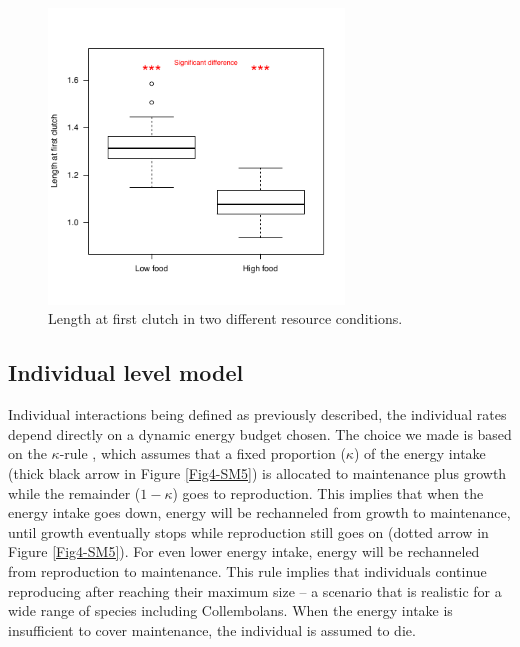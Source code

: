 \begin{figure}[!h] %
\centering
\includegraphics[width=0.7\textwidth]{4_ChapThe1/Fig/FigSM4.pdf}
\caption[Experimental measure of
length at maturity]{Length at first clutch in two different resource
conditions.}
\label{Fig4-SM4}
\end{figure}

\subsection{Individual level model}\label{subsec:SupMat2}

Individual interactions being defined as previously described, the individual
rates depend directly on a dynamic energy budget chosen. The choice we made is
based on the $\kappa$-rule \autocite[][Figure
\ref{Fig4-SM5}]{kooijman1984a,de-roos1997a}, which assumes that a fixed
proportion ($\kappa$) of the energy intake (thick black arrow in Figure
\ref{Fig4-SM5}) is allocated to maintenance plus growth while the remainder
($1-\kappa$) goes to reproduction. This implies that when the energy intake goes
down, energy will be rechanneled from growth to maintenance, until growth eventually stops while
reproduction still goes on (dotted arrow in Figure \ref{Fig4-SM5}). For even lower energy
intake, energy will be rechanneled from reproduction to maintenance. This rule
implies that individuals continue reproducing after reaching their maximum size
-- a scenario that is realistic for a wide range of species including
Collembolans. When the energy intake is insufficient to cover maintenance, the
individual is assumed to die.

